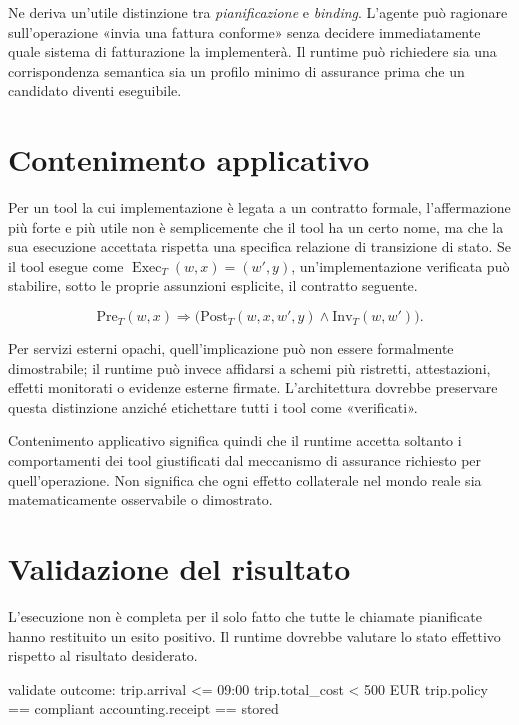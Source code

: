 \documentclass[10pt,oneside,openany]{book}
\begin{document}
Ne deriva un'utile distinzione tra \emph{pianificazione} e \emph{binding}. L'agente può ragionare sull'operazione «invia una fattura conforme» senza decidere immediatamente quale sistema di fatturazione la implementerà. Il runtime può richiedere sia una corrispondenza semantica sia un profilo minimo di assurance prima che un candidato diventi eseguibile.

\section{Contenimento applicativo}
Per un tool la cui implementazione è legata a un contratto formale, l'affermazione più forte e più utile non è semplicemente che il tool ha un certo nome, ma che la sua esecuzione accettata rispetta una specifica relazione di transizione di stato. Se il tool esegue come $\operatorname{Exec}_T(w,x)=(w',y)$, un'implementazione verificata può stabilire, sotto le proprie assunzioni esplicite, il contratto seguente.
\begin{formulabox}
\[
\mathrm{Pre}_T(w,x)\Rightarrow
\bigl(\mathrm{Post}_T(w,x,w',y)\land\mathrm{Inv}_T(w,w')\bigr).
\]
\end{formulabox}
Per servizi esterni opachi, quell'implicazione può non essere formalmente dimostrabile; il runtime può invece affidarsi a schemi più ristretti, attestazioni, effetti monitorati o evidenze esterne firmate. L'architettura dovrebbe preservare questa distinzione anziché etichettare tutti i tool come «verificati».

Contenimento applicativo significa quindi che il runtime accetta soltanto i comportamenti dei tool giustificati dal meccanismo di assurance richiesto per quell'operazione. Non significa che ogni effetto collaterale nel mondo reale sia matematicamente osservabile o dimostrato.

\section{Validazione del risultato}
L'esecuzione non è completa per il solo fatto che tutte le chiamate pianificate hanno restituito un esito positivo. Il runtime dovrebbe valutare lo stato effettivo rispetto al risultato desiderato.

\begin{codeblock}
validate outcome:
  trip.arrival <= 09:00
  trip.total_cost < 500 EUR
  trip.policy == compliant
  accounting.receipt == stored
\end{codeblock}
\end{document}

